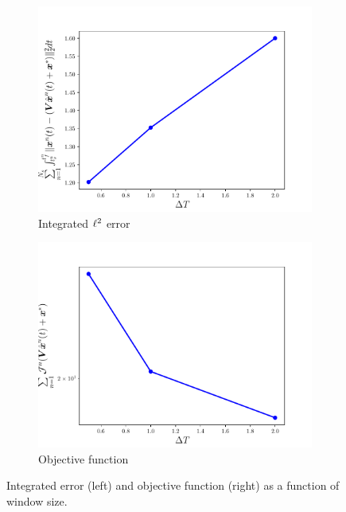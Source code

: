\begin{figure}
\begin{center}
\begin{subfigure}[t]{0.45\textwidth}
\includegraphics[trim={0cm 0cm 0cm 0cm},clip,width=1.\linewidth]{figs/cavity/error_vs_window.pdf}
\caption{Integrated $\ell^2$ error}
\label{fig:cav_results3a}
\end{subfigure}
\begin{subfigure}[t]{0.45\textwidth}
\includegraphics[trim={0cm 0cm 0cm 0cm},clip,width=1.\linewidth]{figs/cavity/objective_vs_window.pdf}
\caption{Objective function} 
\label{fig:cav_results3b}
\end{subfigure}
\end{center}
\caption{Integrated error (left) and objective function (right) as a function of window size.}
\label{fig:cav_results3}
\end{figure}


